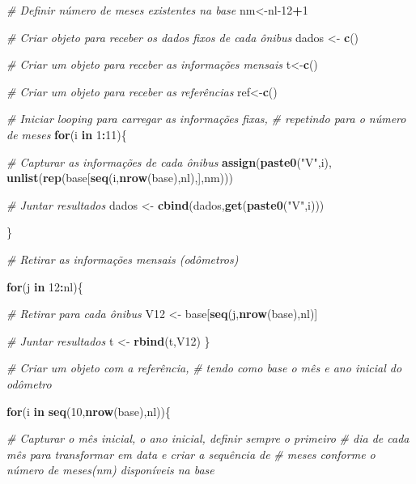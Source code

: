 \documentclass[12pt,a4paper]{article}
\newenvironment{Shaded}{\begin{snugshade}}{\end{snugshade}}
\newcommand{\CommentTok}[1]{\textcolor[rgb]{0.56,0.35,0.01}{\textit{#1}}}
\newcommand{\ControlFlowTok}[1]{\textcolor[rgb]{0.13,0.29,0.53}{\textbf{#1}}}
\newcommand{\DecValTok}[1]{\textcolor[rgb]{0.00,0.00,0.81}{#1}}
\newcommand{\KeywordTok}[1]{\textcolor[rgb]{0.13,0.29,0.53}{\textbf{#1}}}
\newcommand{\NormalTok}[1]{#1}
\newcommand{\OperatorTok}[1]{\textcolor[rgb]{0.81,0.36,0.00}{\textbf{#1}}}
\newcommand{\StringTok}[1]{\textcolor[rgb]{0.31,0.60,0.02}{#1}}
\begin{document}
\begin{Shaded}
\begin{Highlighting}[]
  \CommentTok{# Definir número de meses existentes na base}
\NormalTok{  nm<-nl}\DecValTok{-12}\OperatorTok{+}\DecValTok{1}
  
  \CommentTok{# Criar objeto para receber os dados fixos de cada ônibus}
\NormalTok{  dados <-}\StringTok{ }\KeywordTok{c}\NormalTok{()}
  
  \CommentTok{# Criar um objeto para receber as informações mensais}
\NormalTok{  t<-}\KeywordTok{c}\NormalTok{()}

\CommentTok{# Criar um objeto para receber as referências}
\NormalTok{  ref<-}\KeywordTok{c}\NormalTok{()}

\CommentTok{# Iniciar looping para carregar as informações fixas,}
\CommentTok{# repetindo para o número de meses}
\ControlFlowTok{for}\NormalTok{(i }\ControlFlowTok{in} \DecValTok{1}\OperatorTok{:}\DecValTok{11}\NormalTok{)\{}
  
  \CommentTok{# Capturar as informações de cada ônibus}
  \KeywordTok{assign}\NormalTok{(}\KeywordTok{paste0}\NormalTok{(}\StringTok{"V"}\NormalTok{,i), }\KeywordTok{unlist}\NormalTok{(}\KeywordTok{rep}\NormalTok{(base[}\KeywordTok{seq}\NormalTok{(i,}\KeywordTok{nrow}\NormalTok{(base),nl),],nm)))}
  
  \CommentTok{# Juntar resultados}
\NormalTok{  dados <-}\StringTok{ }\KeywordTok{cbind}\NormalTok{(dados,}\KeywordTok{get}\NormalTok{(}\KeywordTok{paste0}\NormalTok{(}\StringTok{"V"}\NormalTok{,i)))}
  
\NormalTok{\}}

\CommentTok{# Retirar as informações mensais (odômetros)}
  
  \ControlFlowTok{for}\NormalTok{(j }\ControlFlowTok{in} \DecValTok{12}\OperatorTok{:}\NormalTok{nl)\{}
    
    
    \CommentTok{# Retirar para cada ônibus}
\NormalTok{    V12 <-}\StringTok{ }\NormalTok{base[}\KeywordTok{seq}\NormalTok{(j,}\KeywordTok{nrow}\NormalTok{(base),nl)]}
    
    \CommentTok{# Juntar resultados}
\NormalTok{    t <-}\StringTok{ }\KeywordTok{rbind}\NormalTok{(t,V12)}
\NormalTok{\}}

\CommentTok{# Criar um objeto com a referência,}
\CommentTok{# tendo como base o mês e ano inicial do odômetro}

  
  \ControlFlowTok{for}\NormalTok{(i }\ControlFlowTok{in} \KeywordTok{seq}\NormalTok{(}\DecValTok{10}\NormalTok{,}\KeywordTok{nrow}\NormalTok{(base),nl))\{}
    
    \CommentTok{# Capturar o mês inicial, o ano inicial, definir sempre o primeiro}
    \CommentTok{# dia de cada mês para transformar em data e criar a sequência de }
    \CommentTok{# meses conforme o número de meses(nm) disponíveis na base}
    

\end{Highlighting}
\end{Shaded}
\end{document}
